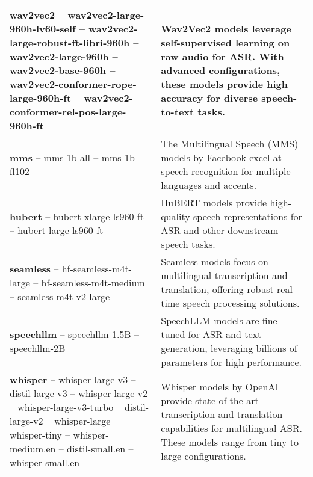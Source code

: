 \begin{table*}[h!]
\begin{tabular}{p{}p{}}
\textbf{wav2vec2} \newline 
-- wav2vec2-large-960h-lv60-self \newline 
-- wav2vec2-large-robust-ft-libri-960h \newline 
-- wav2vec2-large-960h \newline 
-- wav2vec2-base-960h \newline 
-- wav2vec2-conformer-rope-large-960h-ft \newline 
-- wav2vec2-conformer-rel-pos-large-960h-ft & 
Wav2Vec2 models leverage self-supervised learning on raw audio for ASR. With advanced configurations, these models provide high accuracy for diverse speech-to-text tasks. \\ \hline

\textbf{mms} \newline 
-- mms-1b-all \newline 
-- mms-1b-fl102 & 
The Multilingual Speech (MMS) models by Facebook excel at speech recognition for multiple languages and accents. \\ \hline

\textbf{hubert} \newline 
-- hubert-xlarge-ls960-ft \newline 
-- hubert-large-ls960-ft & 
HuBERT models provide high-quality speech representations for ASR and other downstream speech tasks. \\ \hline

\textbf{seamless} \newline 
-- hf-seamless-m4t-large \newline 
-- hf-seamless-m4t-medium \newline 
-- seamless-m4t-v2-large & 
Seamless models focus on multilingual transcription and translation, offering robust real-time speech processing solutions. \\ \hline

\textbf{speechllm} \newline 
-- speechllm-1.5B \newline 
-- speechllm-2B & 
SpeechLLM models are fine-tuned for ASR and text generation, leveraging billions of parameters for high performance. \\ \hline

\textbf{whisper} \newline 
-- whisper-large-v3 \newline 
-- distil-large-v3 \newline 
-- whisper-large-v2 \newline 
-- whisper-large-v3-turbo \newline 
-- distil-large-v2 \newline 
-- whisper-large \newline 
-- whisper-tiny \newline 
-- whisper-medium.en \newline 
-- distil-small.en \newline 
-- whisper-small.en & 
Whisper models by OpenAI provide state-of-the-art transcription and translation capabilities for multilingual ASR. These models range from tiny to large configurations. \\ \hline


\end{tabular}
\end{table*}

